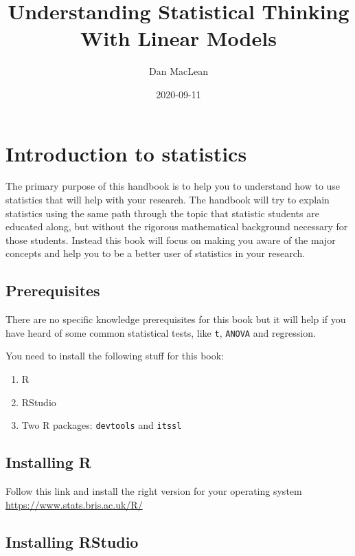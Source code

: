 \documentclass[
]{book}
\title{Understanding Statistical Thinking With Linear Models}
\author{Dan MacLean}
\date{2020-09-11}
\providecommand{\tightlist}{%
  \setlength{\itemsep}{0pt}\setlength{\parskip}{0pt}}
\begin{document}
\maketitle

{
\setcounter{tocdepth}{1}
\tableofcontents
}
\hypertarget{introduction-to-statistics}{%
\chapter{Introduction to statistics}\label{introduction-to-statistics}}

The primary purpose of this handbook is to help you to understand how to use statistics that will help with your research. The handbook will try to explain statistics using the same path through the topic that statistic students are educated along, but without the rigorous mathematical background necessary for those students. Instead this book will focus on making you aware of the major concepts and help you to be a better user of statistics in your research.

\hypertarget{prerequisites}{%
\section{Prerequisites}\label{prerequisites}}

There are no specific knowledge prerequisites for this book but it will help if you have heard of some common statistical tests, like \texttt{t}, \texttt{ANOVA} and regression.

You need to install the following stuff for this book:

\begin{enumerate}
\def\labelenumi{\arabic{enumi}.}
\tightlist
\item
  R
\item
  RStudio
\item
  Two R packages: \texttt{devtools} and \texttt{itssl}
\end{enumerate}

\hypertarget{installing-r}{%
\section{Installing R}\label{installing-r}}

Follow this link and install the right version for your operating system \url{https://www.stats.bris.ac.uk/R/}

\hypertarget{installing-rstudio}{%
\section{Installing RStudio}\label{installing-rstudio}}
\end{document}
